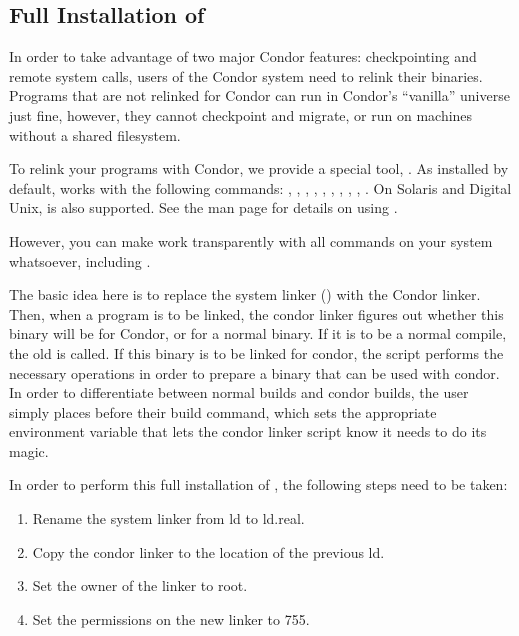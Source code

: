 \subsection{\label{sec:full-condor-compile}Full Installation of
} 

In order to take advantage of two major Condor features: checkpointing
and remote system calls, users of the Condor system need to relink
their binaries.  Programs that are not relinked for Condor can run in
Condor's ``vanilla'' universe just fine, however, they cannot
checkpoint and migrate, or run on machines without a shared filesystem.

To relink your programs with Condor, we provide a special tool,
.  As installed by default,  works
with the following commands: , , ,
, , , , ,
, .  On Solaris and Digital Unix,  is
also supported.  See the  man page for details on
using .

However, you can make  work transparently with all
commands on your system whatsoever, including .  

The basic idea here is to replace the system linker () with
the Condor linker.  Then, when a program is to be linked, the condor
linker figures out whether this binary will be for Condor, or for a
normal binary.  If it is to be a normal compile, the old  is
called.  If this binary is to be linked for condor, the script
performs the necessary operations in order to prepare a binary that
can be used with condor.  In order to differentiate between normal
builds and condor builds, the user simply places 
 before their build command, which sets the
appropriate environment variable that lets the condor linker script
know it needs to do its magic.

In order to perform this full installation of , the
following steps need to be taken:
	
\begin{enumerate}
	\item Rename the system linker from ld to ld.real.
	\item Copy the condor linker to the location of the previous ld.
	\item Set the owner of the linker to root.
	\item Set the permissions on the new linker to 755.
\end{enumerate}

